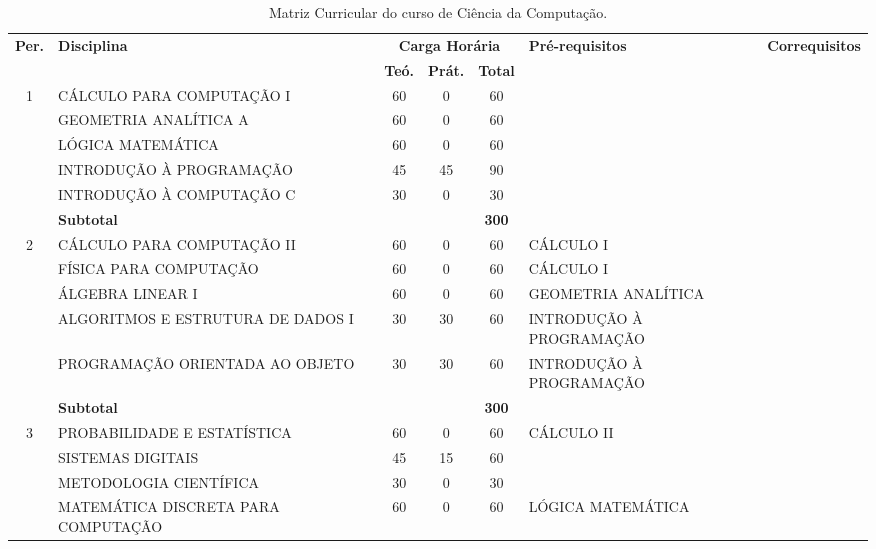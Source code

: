 \documentclass[
	12pt,				%
	openright,			%
  oneside,     %
	a4paper,			%
 hyphens,
	chapter=TITLE,		%
	english,			%
	french,				%
	spanish,			%
	brazil				%
	]{abntex2}
\begin{document}
  \begin{center}
    
    \begin{tiny}
      \begin{longtable}{cp{4.5cm}cccp{2.8cm}p{2.8cm}}
        \caption{\label{quadro:matriz-curricular-do-curso}Matriz Curricular do curso de Ciência da Computação.}\\
      \toprule
      \textbf{Per.} & \textbf{Disciplina} & \multicolumn{3}{c}{\textbf{Carga Horária}} & \textbf{Pré-requisitos} & \textbf{Correquisitos}\\
      & & \textbf{Teó.} & \textbf{Prát.} & \textbf{Total} & & \\
      \midrule
      1 
        & CÁLCULO PARA COMPUTAÇÃO I & 60 & 0 & 60 & & \\ \cline{2-7}
        & GEOMETRIA ANALÍTICA A & 60 & 0 & 60 & & \\ \cline{2-7}
        & LÓGICA MATEMÁTICA & 60 & 0 & 60  & &\\ \cline{2-7}
        & INTRODUÇÃO À PROGRAMAÇÃO & 45 & 45 & 90  & &\\ \cline{2-7}
        & INTRODUÇÃO À COMPUTAÇÃO C & 30 & 0 & 30  & &\\ \midrule
        & \multicolumn{3}{l}{\textbf{Subtotal}} & \textbf{300} & & \\ \midrule
      2 
        & CÁLCULO PARA COMPUTAÇÃO II & 60 & 0 & 60 & CÁLCULO I & \\ \cline{2-7}   
        & FÍSICA PARA COMPUTAÇÃO & 60 & 0 & 60 & CÁLCULO I & \\ \cline{2-7}
        & ÁLGEBRA LINEAR I & 60 & 0 & 60 & GEOMETRIA ANALÍTICA & \\ \cline{2-7}
        & ALGORITMOS E ESTRUTURA DE DADOS I & 30 & 30 & 60 & INTRODUÇÃO À PROGRAMAÇÃO & \\  \cline{2-7}
        & PROGRAMAÇÃO ORIENTADA AO OBJETO & 30 & 30 & 60 & INTRODUÇÃO À PROGRAMAÇÃO & \\ \midrule
        & \multicolumn{3}{l}{\textbf{Subtotal}} & \textbf{300} & & \\ \midrule
    3 
        & PROBABILIDADE E ESTATÍSTICA & 60 & 0 & 60 & CÁLCULO II & \\ \cline{2-7}
        & SISTEMAS DIGITAIS & 45 & 15 & 60 & & \\ \cline{2-7}
        & METODOLOGIA CIENTÍFICA & 30 & 0 & 30 & & \\ \cline{2-7}
        & MATEMÁTICA DISCRETA PARA COMPUTAÇÃO & 60 & 0 & 60 & LÓGICA MATEMÁTICA & \\ \cline{2-7}

\end{longtable}
\end{tiny}
\end{center}
\end{document}
